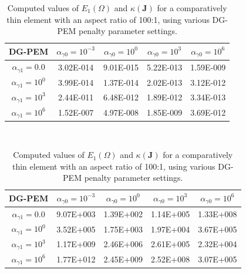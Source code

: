 \begin{table}
\centering
\begin{subtable}{1.0\textwidth}
\centering
\begin{tabular}{| c || c | c | c | c |}
    \hline
DG-PEM & $\alpha_{\gamma0} = 10^{-3}$ & $\alpha_{\gamma0} = 10^{0}$ & $\alpha_{\gamma0} = 10^{3}$ & $\alpha_{\gamma0} = 10^{6}$ \\ \hline \hline
$\alpha_{\gamma1} = 0.0$	& 3.02E-014 & 9.01E-015 & 5.22E-013 & 1.59E-009 \\ \hline
$\alpha_{\gamma1} = 10^{0}$ & 3.99E-014 & 1.37E-014 & 2.02E-013 & 3.12E-012 \\ \hline
$\alpha_{\gamma1} = 10^{3}$ & 2.44E-011 & 6.48E-012 & 1.89E-012 & 3.34E-013 \\ \hline
$\alpha_{\gamma1} = 10^{6}$ & 1.52E-007 & 4.97E-008 & 1.85E-009 & 3.69E-012 \\
    \hline
    \end{tabular}
    \caption{Interpolation error: $E_1 (\Omega)$}
    \label{tab:thin_interpolation_error_k1}
\end{subtable}%
\\
\begin{subtable}{1.0\textwidth}
\centering
\begin{tabular}{| c || c | c | c | c |}
    \hline
DG-PEM & $\alpha_{\gamma0} = 10^{-3}$	&	$\alpha_{\gamma0} = 10^{0}$	&	$\alpha_{\gamma0} = 10^{3}$	&	$\alpha_{\gamma0} = 10^{6}$ \\ \hline \hline
$\alpha_{\gamma1} = 0.0$	& 9.07E+003 & 1.39E+002 & 1.14E+005 & 1.33E+008 \\ \hline
$\alpha_{\gamma1} = 10^{0}$	& 3.52E+005 & 1.75E+003 & 1.97E+004 & 3.67E+005 \\ \hline
$\alpha_{\gamma1} = 10^{3}$	& 1.17E+009 & 2.46E+006 & 2.61E+005 & 2.32E+004 \\ \hline
$\alpha_{\gamma1} = 10^{6}$	& 1.77E+012 & 2.45E+009 & 2.52E+008 & 3.07E+005 \\
    \hline
    \end{tabular}
    \caption{DG-PEM linear system conditioning: $\kappa(\mathbf{J})$}
    \label{tab:thin_condJ_k1}
\end{subtable}

\caption{Computed values of $E_1 (\Omega)$ and $\kappa(\mathbf{J})$ for a comparatively thin element with an aspect ratio of 100:1, using various DG-PEM penalty parameter settings.}
\label{tab:thin_interpolation_error_and_condJ_k1}
\end{table}

